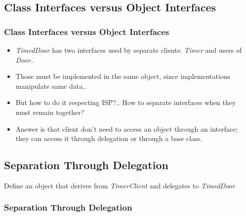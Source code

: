 \documentclass{beamer}
\begin{document}
\subsection{Class Interfaces versus Object Interfaces}
\begin{frame}[containsverbatim]
	\frametitle{Class Interfaces versus Object Interfaces}
  \begin{itemize}
	\item<+-> \textit{TimedDoor} has two interfaces used by separate clients: \textit{Timer} and users of \textit{Door}..
	\item<+-> Those must be implemented in the same object, since implementations manipulate same data..
	\item<+-> But how to do it respecting ISP?.. How to separate interfaces when they must remain together?
	\item<+-> Answer is that client don't need to access an object through an interface; they can access it through delegation or through a base class.
   \end{itemize}
\end{frame}

\subsection{Separation Through Delegation}
\begin{frame}
  Define an object that derives from \textit{TimerClient} and delegates to \textit{TimedDoor} \\
  \frametitle{Separation Through Delegation}
  \begin{center}
	\end{center}
\end{frame}
\end{document}
